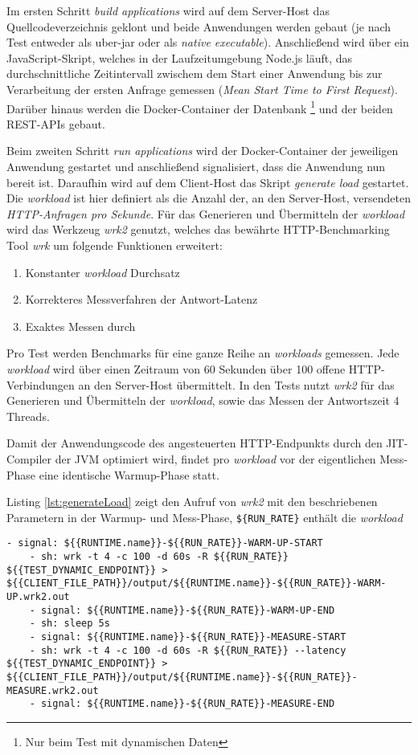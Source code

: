 Im ersten Schritt \textit{build applications} wird auf dem Server-Host das Quellcodeverzeichnis geklont und beide Anwendungen werden gebaut
(je nach Test entweder als uber-jar oder als \textit{native executable}). Anschließend wird über ein JavaScript-Skript,
welches in der Laufzeitumgebung Node.js läuft, das durchschnittliche Zeitintervall zwischem dem Start einer Anwendung bis
zur Verarbeitung der ersten Anfrage gemessen
(\textit{Mean Start Time to First Request}). Darüber hinaus werden die Docker-Container der Datenbank
\footnote{Nur beim Test mit dynamischen Daten} und der beiden REST-APIs gebaut.

Beim zweiten Schritt \textit{run applications} wird der Docker-Container der jeweiligen Anwendung gestartet und anschließend signalisiert,
dass die Anwendung nun bereit ist.
Daraufhin wird auf dem Client-Host das Skript \textit{generate load} gestartet.
Die \textit{workload} ist hier definiert als die Anzahl der, an den Server-Host, versendeten \textit{HTTP-Anfragen pro Sekunde}.
Für das Generieren und Übermitteln der \textit{workload} wird das Werkzeug \textit{wrk2} genutzt, welches das
bewährte HTTP-Benchmarking Tool \textit{wrk} um folgende Funktionen erweitert:
\begin{enumerate}
    \item Konstanter \textit{workload} Durchsatz
    \item Korrekteres Messverfahren der Antwort-Latenz
    \item Exaktes Messen durch 
\end{enumerate}\cite{Wrk2, Wrk}

Pro Test werden Benchmarks für eine ganze Reihe an \textit{workloads} gemessen.
Jede \textit{workload} wird über einen Zeitraum von 60 Sekunden über 100 offene HTTP-Verbindungen an den Server-Host übermittelt.
In den Tests nutzt \textit{wrk2} für das Generieren und Übermitteln der \textit{workload}, sowie das Messen der Antwortszeit
4 Threads.

Damit der Anwendungscode des angesteuerten HTTP-Endpunkts durch den JIT-Compiler der JVM optimiert wird,
findet pro \textit{workload} vor der eigentlichen Mess-Phase eine identische Warmup-Phase statt.

Listing \ref*{lst:generateLoad} zeigt den Aufruf von \textit{wrk2} mit den beschriebenen Parametern in der Warmup- und Mess-Phase,
\verb|${RUN_RATE}| enthält die \textit{workload}

\begin{lstlisting}[caption=Auszug des qDup Skripts generate load, captionpos=b, label=lst:generateLoad]
    - signal: ${{RUNTIME.name}}-${{RUN_RATE}}-WARM-UP-START
    - sh: wrk -t 4 -c 100 -d 60s -R ${{RUN_RATE}} ${{TEST_DYNAMIC_ENDPOINT}} > ${{CLIENT_FILE_PATH}}/output/${{RUNTIME.name}}-${{RUN_RATE}}-WARM-UP.wrk2.out
    - signal: ${{RUNTIME.name}}-${{RUN_RATE}}-WARM-UP-END
    - sh: sleep 5s
    - signal: ${{RUNTIME.name}}-${{RUN_RATE}}-MEASURE-START
    - sh: wrk -t 4 -c 100 -d 60s -R ${{RUN_RATE}} --latency ${{TEST_DYNAMIC_ENDPOINT}} > ${{CLIENT_FILE_PATH}}/output/${{RUNTIME.name}}-${{RUN_RATE}}-MEASURE.wrk2.out
    - signal: ${{RUNTIME.name}}-${{RUN_RATE}}-MEASURE-END
   \end{lstlisting}


